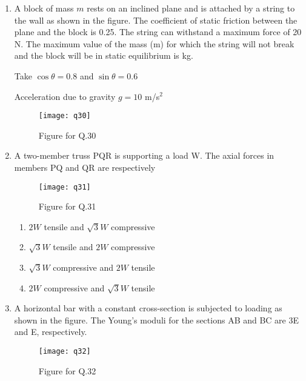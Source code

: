 \documentclass[journal,11pt,onecolumn]{IEEEtran}
\begin{document}
\begin{enumerate}[resume]
    \item A block of mass $m$ rests on an inclined plane and is attached by a string to the wall as shown in the figure. The coefficient of static friction between the plane and the block is 0.25. The string can withstand a maximum force of 20 N. The maximum value of the mass (m) for which the string will not break and the block will be in static equilibrium is \underline{\hspace{2cm}} kg.

          Take $\cos \theta = 0.8$ and $\sin \theta = 0.6$

          Acceleration due to gravity $g = 10$ m/s$^2$

          \begin{figure}[H]
              \centering
              \texttt{[image: q30]}
              \caption{Figure for Q.30}
              \label{q30}
          \end{figure}

    \item A two-member truss PQR is supporting a load W. The axial forces in members PQ and QR are respectively

          \begin{figure}[H]
              \centering
              \texttt{[image: q31]}
              \caption{Figure for Q.31}
              \label{q31}
          \end{figure}

          \begin{enumerate}

              \item $2W$ tensile and $\sqrt{3}W$ compressive

              \item $\sqrt{3}W$ tensile and $2W$ compressive

              \item $\sqrt{3}W$ compressive and $2W$ tensile

              \item $2W$ compressive and $\sqrt{3}W$ tensile

          \end{enumerate}

    \item A horizontal bar with a constant cross-section is subjected to loading as shown in the figure. The Young's moduli for the sections AB and BC are 3E and E, respectively.

          \begin{figure}[H]
              \centering
              \texttt{[image: q32]}
              \caption{Figure for Q.32}
              \label{q32}
          \end{figure}


\end{enumerate}
\end{document}
